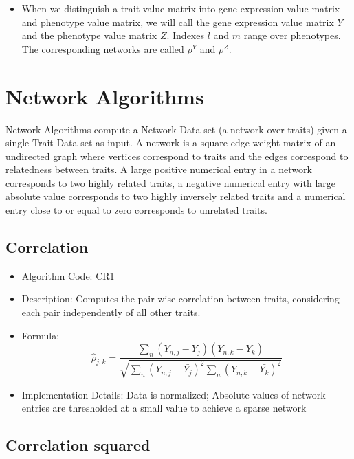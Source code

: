 \documentclass{article}
\begin{document}
\begin{itemize}
\item When we distinguish a trait value matrix into gene expression value matrix and phenotype value matrix, we will call the gene expression value matrix $Y$ and the phenotype value matrix $Z$. Indexes $l$ and $m$ range over phenotypes. The corresponding networks are called $\rho^Y$ and $\rho^Z$.
\end{itemize}


\section{Network Algorithms}

Network Algorithms compute a Network Data set (a network over traits) given a single Trait Data set as input. A network is a square edge weight matrix of an undirected graph where vertices correspond to traits and the edges correspond to relatedness between traits. A large positive numerical entry in a network corresponds to two highly related traits, a negative numerical entry with large absolute value corresponds to two highly inversely related traits and a numerical entry close to or equal to zero corresponds to unrelated traits.\\

\subsection{Correlation}

\begin{itemize}
\item Algorithm Code: CR1
\item Description: Computes the pair-wise correlation between traits, considering each pair independently of all other traits.
\item Formula:
\begin{equation*}
\hat{\rho}_{j,k} = \frac{\sum_n (Y_{n,j} - \bar{Y_j})(Y_{n,k} - \bar{Y_k})}{\sqrt{\sum_n (Y_{n,j} - \bar{Y_j})^2 \sum_n (Y_{n,k} - \bar{Y_k})^2}}
\end{equation*}
\item Implementation Details: Data is normalized; Absolute values of network entries are thresholded at a small value to achieve a sparse network 
\end{itemize}

\subsection{Correlation squared}
\end{document}
